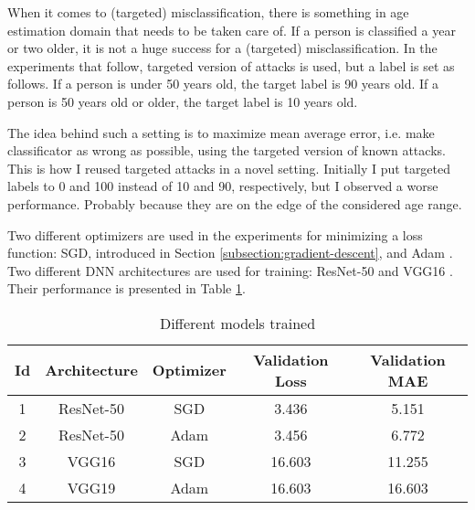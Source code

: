 When it comes to (targeted) misclassification, there is something in age estimation domain that needs to be taken care of. If a person is classified a year or two older, it is not a huge success for a (targeted) misclassification. In the experiments that follow, targeted version of attacks is used, but a label is set as follows. If a person is under 50 years old, the target label is 90 years old. If a person is 50 years old or older, the target label is 10 years old. 

The idea behind such a setting is to maximize mean average error, i.e. make classificator as wrong as possible, using the targeted version of known attacks.  This is how I reused targeted attacks in a novel setting. Initially I put targeted labels to 0 and 100 instead of 10 and 90, respectively, but I observed a worse performance. Probably because they are on the edge of the considered age range.

Two different optimizers are used in the experiments for minimizing a loss function: SGD, introduced in Section \ref{subsection:gradient-descent}, and Adam \cite{DBLP:journals/corr/KingmaB14}. Two different DNN architectures are used for training: ResNet-50 \cite{DBLP:journals/corr/HeZRS15} and VGG16 \cite{DBLP:journals/corr/SimonyanZ14a}. Their performance is presented in Table \ref{table:trained-models}.

\begin{table}[]
\centering
\begin{tabular}{|c|c|c|c|c|}
\hline
Id & Architecture & Optimizer & Validation Loss & \textbf{Validation MAE} \\ \hline
1 & ResNet-50 & SGD & 3.436 & 5.151 \\ \hline
2 & ResNet-50 & Adam & 3.456 & 6.772 \\ \hline
3 & VGG16 & SGD & 16.603 & 11.255 \\ \hline
4 & VGG19 & Adam & 16.603 & 16.603 \\ \hline
\end{tabular}
\caption{Different models trained}
\label{table:trained-models}
\end{table}

